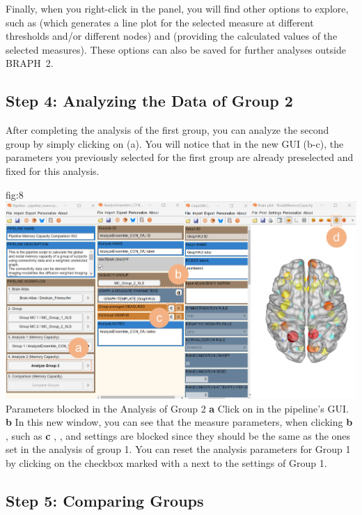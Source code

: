 \documentclass[justified]{tufte-handout}
\begin{document}
Finally, when you right-click in the  panel, you will find other options to explore, such as  (which generates a line plot for the selected measure at different thresholds and/or different nodes) and  (providing the calculated values of the selected measures). These options can also be saved for further analyses outside BRAPH~2.



\subsection{Step 4: Analyzing the Data of Group 2}

After completing the analysis of the first group, you can analyze the second group by simply clicking on  (a). You will notice that in the new GUI (b-c), the parameters you previously selected for the first group are already preselected and fixed for this analysis. 

{fig:8}
{
	\includegraphics{fig08.jpg}
}
{Parameters blocked in the Analysis of Group 2}
{
	{\bf a} Click on  in the pipeline's GUI.
	{\bf b} In this new window, you can see that the measure parameters, when clicking {\bf b} , such as  {\bf c} ,  ,  and  settings are blocked since they should be the same as the ones set in the analysis of group 1. You can reset the analysis parameters for Group 1 by clicking on the checkbox marked with a  next to the settings of Group 1.
}




\clearpage
\subsection{Step 5: Comparing Groups}
\end{document}
